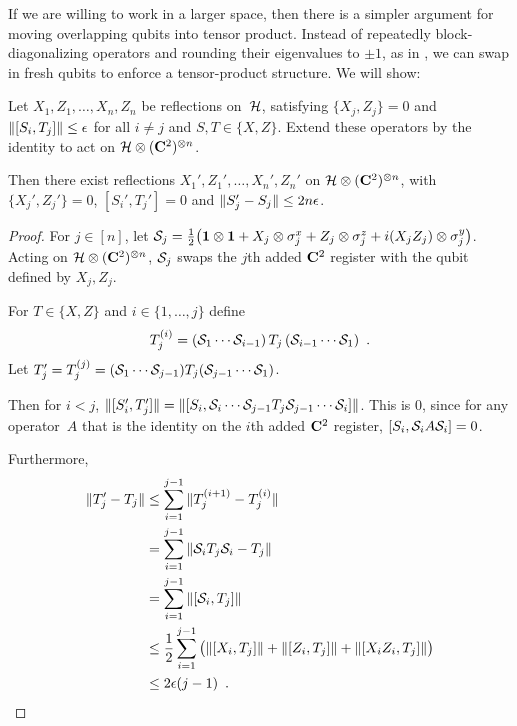 \documentclass[preprintnumbers,11pt,onecolumn]{article}
\begin{document}
If we are willing to work in a larger space, then there is a simpler argument for moving overlapping qubits into tensor product.  Instead of repeatedly block-diagonalizing operators and rounding their eigenvalues to $\pm 1$, as in , we can swap in fresh qubits to enforce a tensor-product structure.  We will show: 

\begin{theorem} \label{t:swappingmanynearlyindependentqubits}
Let $X_1, Z_1, \ldots, X_n, Z_n$ be reflections on~$\H$, satisfying $\{X_j, Z_j\} = 0$ and $\norm{[S_i, T_j]} \leq \epsilon$ for all $i \neq j$ and $S, T \in \{X, Z\}$.  Extend these operators by the identity to act on $\H \otimes (\C^2)^{\otimes n}$.  

Then there exist reflections $X_1', Z_1', \ldots, X_n', Z_n'$ on $\H \otimes (\C^2)^{\otimes n}$, with $\{X_j', Z_j'\} = 0$, $[S_i', T_j'] = 0$ and $\norm{S_j' - S_j} \leq 2 n \epsilon$.  
\end{theorem}

\begin{proof}
For $j \in [n]$, let $\S_j = \frac12 \big( \identity \otimes \identity + X_j \otimes \sigma^x_j + Z_j \otimes \sigma^z_j + i (X_j Z_j) \otimes \sigma^y_j \big)$.  Acting on $\H \otimes (\C^2)^{\otimes n}$, $\S_j$ swaps the $j$th added $\C^2$ register with the qubit defined by $X_j, Z_j$.  

For $T \in \{X, Z\}$ and $i \in \{ 1, \ldots, j \}$ define 
\begin{equation*}
T_j^{(i)} = (\S_1 \cdots \S_{i-1}) \, T_j \, (\S_{i-1} \cdots \S_1)
 \enspace .
\end{equation*}
Let $T_j' = T_j^{(j)} = (\S_1 \cdots \S_{j-1}) T_j (\S_{j-1} \cdots \S_1)$.  

Then for $i < j$, $\norm{[S_i', T_j']} = \norm{[S_i, \S_i \cdots \S_{j-1} T_j \S_{j-1} \cdots \S_i]}$.  This is $0$, since for any operator~$A$ that is the identity on the $i$th added $\C^2$ register, $[S_i, \S_i A \S_i] = 0$.  

Furthermore, 
\begin{align*}
\norm{T_j' - T_j}
&\leq \sum_{i=1}^{j-1} \norm{T_j^{(i+1)} - T_j^{(i)}} \\
&= \sum_{i=1}^{j-1} \norm{\S_i T_j \S_i - T_j} \\
&= \sum_{i=1}^{j-1} \norm{[\S_i, T_j]} \\
&\leq \frac12 \sum_{i=1}^{j-1} \big( \norm{[X_i, T_j]} + \norm{[Z_i, T_j]} + \norm{[X_i Z_i, T_j]} \big) \\
&\leq 2 \epsilon (j-1)
 \enspace . \qedhere
\end{align*}
\end{proof}
\end{document}

